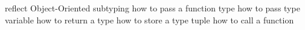 reflect
Object-Oriented
subtyping
how to pass a function type
how to pass type variable
how to return a type
how to store a type
tuple
how to call a function


